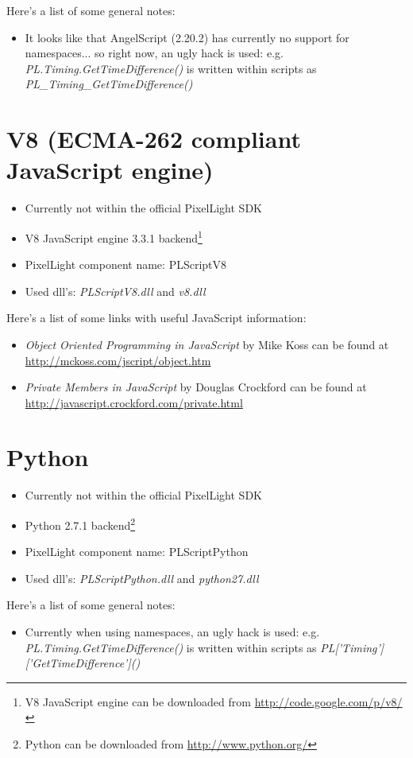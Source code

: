 Here's a list of some general notes:
\begin{itemize}
\item It looks like that AngelScript (2.20.2) has currently no support for namespaces... so right now, an ugly hack is used: e.g. \emph{PL.Timing.GetTimeDifference()} is written within scripts as \emph{PL\_Timing\_GetTimeDifference()}
\end{itemize}




\section{V8 (ECMA-262 compliant JavaScript engine)}
\begin{itemize}
\item Currently not within the official PixelLight SDK
\item V8 JavaScript engine 3.3.1 backend\footnote{V8 JavaScript engine can be downloaded from \url{http://code.google.com/p/v8/}}
\item PixelLight component name: PLScriptV8
\item Used dll's: \emph{PLScriptV8.dll} and \emph{v8.dll}
\end{itemize}

Here's a list of some links with useful JavaScript information:
\begin{itemize}
\item \emph{Object Oriented Programming in JavaScript} by Mike Koss  can be found at \url{http://mckoss.com/jscript/object.htm}
\item \emph{Private Members in JavaScript} by Douglas Crockford can be found at \url{http://javascript.crockford.com/private.html}
\end{itemize}




\section{Python}
\begin{itemize}
\item Currently not within the official PixelLight SDK
\item Python 2.7.1 backend\footnote{Python can be downloaded from \url{http://www.python.org/}}
\item PixelLight component name: PLScriptPython
\item Used dll's: \emph{PLScriptPython.dll} and \emph{python27.dll}
\end{itemize}

Here's a list of some general notes:
\begin{itemize}
\item Currently when using namespaces, an ugly hack is used: e.g. \emph{PL.Timing.GetTimeDifference()} is written within scripts as \emph{PL['Timing']['GetTimeDifference']()}
\end{itemize}
